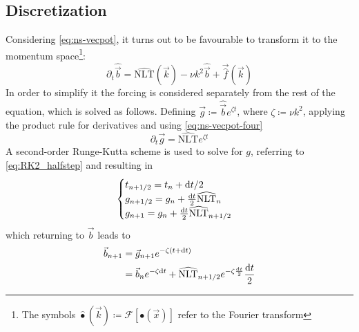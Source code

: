 
\subsection{Discretization}
Considering \autoref{eq:ns-vecpot}, it turns out to be favourable to transform it to the momentum space\footnote{The symbols \( \widehat{\bullet} (\vec{k}) \coloneqq \mathcal{F}[\bullet(\vec{x})] \) refer to the Fourier transform}:
\begin{equation} \label{eq:ns-vecpot-four}
\partial_t \widehat{\vec{b}} = \widehat{\mathrm{NLT}}(\vec{k}) - \nu k^2 \widehat{\vec{b}} + \vec{\widehat{f}}(\vec{k})
\end{equation}
In order to simplify it the forcing is considered separately from the rest of the equation, which is solved as follows.
Defining \( \vec{g} \coloneqq \widehat{\vec{b}} e^{\zeta t} \), where \( \zeta \coloneq \nu k^2 \), applying the product rule for derivatives and using \autoref{eq:ns-vecpot-four}
\[ \partial_t \vec{g} = \widehat{\mathrm{NLT}} e ^{\zeta t} \]
A second-order Runge-Kutta scheme is used to solve for $g$, referring to \autoref{eq:RK2_halfstep} and resulting in  
\begin{equation}
  \begin{cases} 
    t_{n+1/2} = t_n + \mathrm{d}t/2 & \\
    g_{n+1/2} =  g_n + \frac{\mathrm{d}t}{2}\widehat{\mathrm{NLT}}_n &\\
    g_{n+1} = g_n + \frac{\mathrm{d}t}{2}\widehat{\mathrm{NLT}}_{n+1/2} &\\
  \end{cases}
\end{equation}
which returning to $\vec{b}$ leads to
\begin{align}
\vec{b}_{n+1} &= \vec{g}_{n+1} e^{-\zeta(t+\mathrm{d}t)} \\
              &= \vec{b}_n e^{-\zeta \mathrm{d}t} +
\widehat{\mathrm{NLT}}_{n+1/2} e^{-\zeta\frac{\mathrm{d}t}{2} } \frac{\mathrm{d}t}{2} \end{align}



